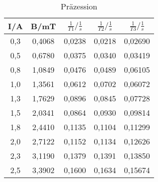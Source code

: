 %
%
%
%
%




\begin{table}
  \centering
  \caption{Präzession}
  \label{tab:präzession}
  \begin{tabular}{c c c c c}
    \toprule
     I/A &		B/mT	 & $\frac{1}{T1}/\frac{1}{s}$ & $\frac{1}{T2}/\frac{1}{s}$	&  $\frac{1}{T3}/\frac{1}{s}$\\
    \midrule
    0,3	&	0,4068 	& 0,0238	&	0,0218	& 	0,02690 \\
    0,5	&	0,6780	&	0,0375	&	0,0340	& 	0,03419 \\
    0,8	&	1,0849	&	0,0476	&	0,0489	& 	0,06105 \\
    1,0 &	1,3561	&	0,0612	&	0,0702	& 	0,06072 \\
    1,3	&	1,7629	&	0,0896	&	0,0845	& 	0,07728 \\
    1,5	&	2,0341 	&	0,0864	&	0,0930	& 	0,09814 \\
    1,8	&	2,4410 	&	0,1135 	&	0,1104	& 	0,11299 \\
    2,0 &	2,7122	&	0,1152	&	0,1134	& 	0,12626 \\
    2,3	&	3,1190	&	0,1379	&	0,1391	& 	0,13850 \\
    2,5	&	3,3902	&	0,1600 	&	0,1634	& 	0,15674 \\
    \bottomrule
  \end{tabular}
\end{table}


%
